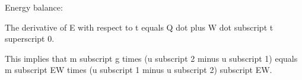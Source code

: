 Energy balance:

The derivative of E with respect to t equals Q dot plus W dot subscript t superscript 0.

This implies that m subscript g times (u subscript 2 minus u subscript 1) equals m subscript EW times (u subscript 1 minus u subscript 2) subscript EW.